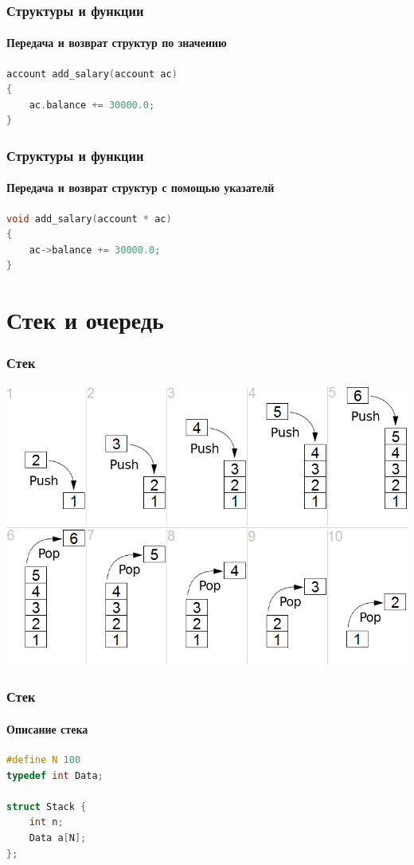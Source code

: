 \documentclass[12pt,pdf,hyperref={unicode}]{beamer}
\begin{document}
\begin{frame}[fragile]
\frametitle{Структуры и функции} 
\framesubtitle{Передача и возврат структур по значению} 

\begin{lstlisting}[language=C++,basicstyle=\ttfamily,keywordstyle=\color{blue}]
account add_salary(account ac)
{
    ac.balance += 30000.0;
}
\end{lstlisting}
\end{frame}

\begin{frame}[fragile]
\frametitle{Структуры и функции} 
\framesubtitle{Передача и возврат структур с помощью указателй} 

\begin{lstlisting}[language=C++,basicstyle=\ttfamily,keywordstyle=\color{blue}]
void add_salary(account * ac)
{
    ac->balance += 30000.0;
}
\end{lstlisting}
\end{frame}




\section{Стек и очередь}


\begin{frame}[fragile]
\frametitle{Стек} 
\begin{center}
\includegraphics[width=0.8\linewidth]{images/Lifo_stack.png}
\end{center}
\end{frame}


\begin{frame}[fragile]
\frametitle{Стек} 
\framesubtitle{Описание стека} 

\begin{lstlisting}[language=C++,basicstyle=\ttfamily,keywordstyle=\color{blue}]
#define N 100
typedef int Data;

struct Stack {
    int n;
    Data a[N];
};
\end{lstlisting}
\end{frame}
\end{document}
